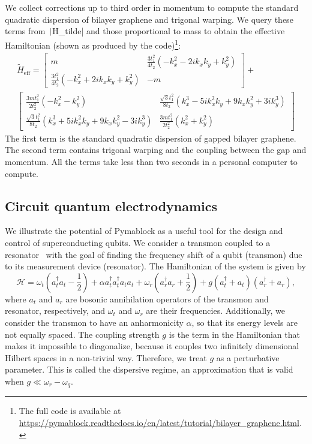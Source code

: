 We collect corrections up to third order in momentum to compute the standard
quadratic dispersion of bilayer graphene and trigonal warping.
We query these terms from \texttt|H_tilde| and those proportional
to mass to obtain the effective Hamiltonian (shown as produced by the
code)\footnote{The full code is available at
\url{https://pymablock.readthedocs.io/en/latest/tutorial/bilayer_graphene.html}.}:
%
{\small
\begin{gather}
\tilde{H}_{\textrm{eff}} =
\begin{bmatrix}
m & \frac{3 t_1^2}{4 t_2} ( - k_x^2 - 2ik_x k_y + k_y^2) \\
\frac{3 t_1^2}{4 t_2} ( - k_x^2 + 2ik_x k_y + k_y^2) & -m
\end{bmatrix} + \nonumber \\
\begin{bmatrix}
\frac{3 m t_1^2}{2 t_2^2} ( - k_x^2 - k_y^2) & \frac{\sqrt{3} t_1^2}{8 t_2} (k_x^3 - 5ik_x^2 k_y + 9 k_x k_y^2 + 3ik_y^3) \\
\frac{\sqrt{3} t_1^2}{8 t_2} (k_x^3 + 5ik_x^2 k_y + 9 k_x k_y^2 - 3ik_y^3) & \frac{3 m t_1^2}{2 t_2^2} (k_x^2 + k_y^2)
\end{bmatrix} \nonumber
\end{gather}
}
%
The first term is the standard quadratic dispersion of gapped bilayer
graphene.
The second term contains trigonal warping and the coupling between the gap and
momentum.
All the terms take less than two seconds in a personal computer to compute.

\subsection{Circuit quantum electrodynamics}

We illustrate the potential of Pymablock as a useful tool for the
design and control of superconducting qubits.
We consider a transmon coupled to a resonator~\cite{Krantz_2019} with the goal
of finding the frequency shift of a qubit (transmon) due to its measurement
device (resonator).
The Hamiltonian of the system is given by
%
\begin{equation}
    \label{eq:H_cqed}
    \mathcal{H} =
    \omega_t (a^{\dagger}_{t} a_{t} - \frac{1}{2})
    + \alpha a^{\dagger}_{t} a^{\dagger}_{t} a_{t} a_{t} +
    \omega_r (a^{\dagger}_{r} a_{r} + \frac{1}{2}) +
    g (a^{\dagger}_{t} + a_{t}) (a^{\dagger}_{r} + a_{r}),
\end{equation}
%
where $a_t$ and $a_r$ are bosonic annihilation operators of the transmon
and resonator, respectively, and $\omega_t$ and $\omega_r$ are their
frequencies.
Additionally, we consider the transmon to have an anharmonicity $\alpha$,
so that its energy levels are not equally spaced.
The coupling strength $g$ is the term in the Hamiltonian that makes it
impossible to diagonalize, because it couples two infinitely dimensional
Hilbert spaces in a non-trivial way.
Therefore, we treat $g$ as a perturbative parameter.
This is called the dispersive regime, an approximation that is valid when
$g \ll \omega_{r} - \omega_{q}$.

